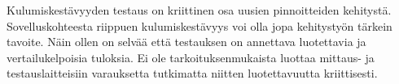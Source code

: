 \documentclass[12pt,a4paper,finnish]{tutthesis}
\begin{document}





Kulumiskestävyyden testaus on kriittinen osa uusien pinnoitteiden kehitystä.
Sovelluskohteesta riippuen kulumiskestävyys voi olla jopa kehitystyön tärkein
tavoite. Näin ollen on selvää että testauksen on annettava luotettavia ja
vertailukelpoisia tuloksia. Ei ole tarkoituksenmukaista luottaa mittaus- ja
testauslaitteisiin varauksetta tutkimatta niitten luotettavuutta kriittisesti.
\end{document}
